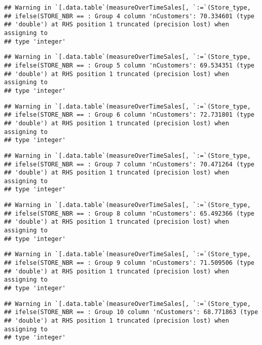 \documentclass[
]{article}
\begin{document}
\begin{verbatim}
## Warning in `[.data.table`(measureOverTimeSales[, `:=`(Store_type,
## ifelse(STORE_NBR == : Group 4 column 'nCustomers': 70.334601 (type
## 'double') at RHS position 1 truncated (precision lost) when assigning to
## type 'integer'
\end{verbatim}

\begin{verbatim}
## Warning in `[.data.table`(measureOverTimeSales[, `:=`(Store_type,
## ifelse(STORE_NBR == : Group 5 column 'nCustomers': 69.534351 (type
## 'double') at RHS position 1 truncated (precision lost) when assigning to
## type 'integer'
\end{verbatim}

\begin{verbatim}
## Warning in `[.data.table`(measureOverTimeSales[, `:=`(Store_type,
## ifelse(STORE_NBR == : Group 6 column 'nCustomers': 72.731801 (type
## 'double') at RHS position 1 truncated (precision lost) when assigning to
## type 'integer'
\end{verbatim}

\begin{verbatim}
## Warning in `[.data.table`(measureOverTimeSales[, `:=`(Store_type,
## ifelse(STORE_NBR == : Group 7 column 'nCustomers': 70.471264 (type
## 'double') at RHS position 1 truncated (precision lost) when assigning to
## type 'integer'
\end{verbatim}

\begin{verbatim}
## Warning in `[.data.table`(measureOverTimeSales[, `:=`(Store_type,
## ifelse(STORE_NBR == : Group 8 column 'nCustomers': 65.492366 (type
## 'double') at RHS position 1 truncated (precision lost) when assigning to
## type 'integer'
\end{verbatim}

\begin{verbatim}
## Warning in `[.data.table`(measureOverTimeSales[, `:=`(Store_type,
## ifelse(STORE_NBR == : Group 9 column 'nCustomers': 71.509506 (type
## 'double') at RHS position 1 truncated (precision lost) when assigning to
## type 'integer'
\end{verbatim}

\begin{verbatim}
## Warning in `[.data.table`(measureOverTimeSales[, `:=`(Store_type,
## ifelse(STORE_NBR == : Group 10 column 'nCustomers': 68.771863 (type
## 'double') at RHS position 1 truncated (precision lost) when assigning to
## type 'integer'
\end{verbatim}
\end{document}
